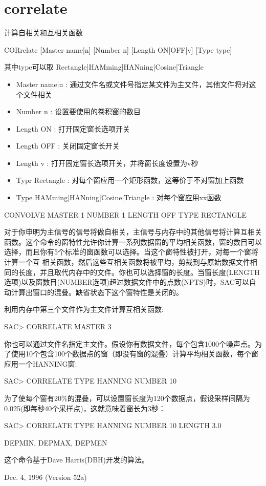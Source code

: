 \section{correlate}
\label{cmd:correlate}

计算自相关和互相关函数

CORrelate [Master name|n] [Number n] [Length ON|OFF|v] [Type type]

其中type可以取 Rectangle|HAMming|HANning|Cosine|Triangle

\begin{itemize}
\item Master name|n : 通过文件名或文件号指定某文件为主文件，其他文件将对这个文件相关
\item Number n : 设置要使用的卷积窗的数目
\item Length ON : 打开固定窗长选项开关
\item Length OFF : 关闭固定窗长开关
\item Length v : 打开固定窗长选项开关，并将窗长度设置为v秒
\item Typr Rectangle : 对每个窗应用一个矩形函数，这等价于不对窗加上函数
\item Type HAMming|HANning|Cosine|Triangle : 对每个窗应用xx函数
\end{itemize}

CONVOLVE MASTER 1 NUMBER 1 LENGTH OFF TYPE RECTANGLE

对于你申明为主信号的信号将做自相关，主信号与内存中的其他信号将计算互相关函数。这个命令的窗特性允许你计算一系列数据窗的平均相关函数，窗的数目可以选择，而且你有5个标准的窗函数可以选择。当这个窗特性被打开，对每一个窗将计算一个互	相关函数，然后这些互相关函数将被平均，剪裁到与原始数据文件相同的长度，并且取代内存中的文件。你也可以选择窗的长度。当窗长度(LENGTH选项)以及窗数目(NUMBER选项)超过数据文件中的点数(NPTS)时，SAC可以自动计算出窗口的混叠。缺省状态下这个窗特性是关闭的。

利用内存中第三个文件作为主文件计算互相关函数:
\begin{SACCode}
SAC> CORRELATE MASTER 3
\end{SACCode}
你也可以通过文件名指定主文件。假设你有数据文件，每个包含1000个噪声点。为了使用10个包含100个数据点的窗（即没有窗的混叠）计算平均相关函数，每个窗应用一个HANNING窗:
\begin{SACCode}
SAC> CORRELATE TYPE HANNING NUMBER 10
\end{SACCode}
为了使每个窗有20\%的混叠，可以设置窗长度为120个数据点，假设采样间隔为0.025(即每秒40个采样点)，这就意味着窗长为3秒：
\begin{SACCode}
SAC> CORRELATE TYPE HANNING NUMBER 10 LENGTH 3.0
\end{SACCode}

DEPMIN, DEPMAX, DEPMEN

这个命令基于Dave Harris(DBH)开发的算法。

Dec. 4, 1996 (Version 52a)
